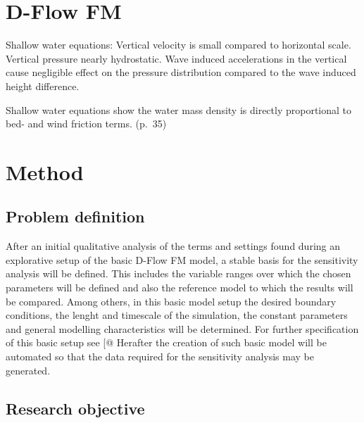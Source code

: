 \section{D-Flow FM}\label{d-flow-fm}

Shallow water equations: Vertical velocity is small compared to
horizontal scale. Vertical pressure nearly hydrostatic. Wave induced
accelerations in the vertical cause negligible effect on the pressure
distribution compared to the wave induced height difference.

Shallow water equations show the water mass density is directly
proportional to bed- and wind friction terms. (p.~35)

\section{Method}\label{method}

\subsection{Problem definition}\label{problem-definition}

After an initial qualitative analysis of the terms and settings found
during an explorative setup of the basic D-Flow FM model, a stable basis
for the sensitivity analysis will be defined. This includes the variable
ranges over which the chosen parameters will be defined and also the
reference model to which the results will be compared. Among others, in
this basic model setup the desired boundary conditions, the lenght and
timescale of the simulation, the constant parameters and general
modelling characteristics will be determined. For further specification
of this basic setup see {[}@ Herafter the creation of such basic model
will be automated so that the data required for the sensitivity analysis
may be generated.

\subsection{Research objective}\label{research-objective}

